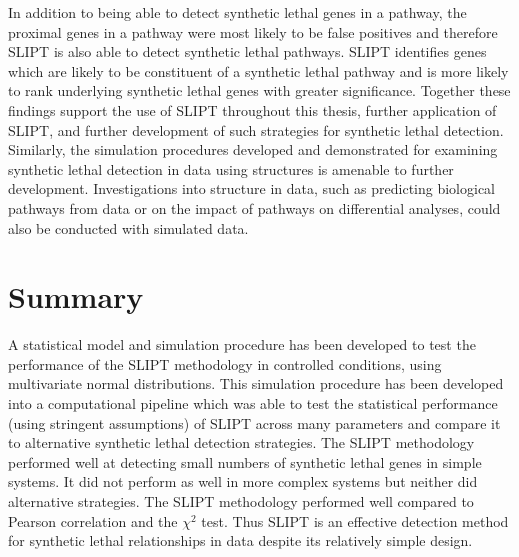 In addition to being able to detect \gls{synthetic lethal} genes in a pathway, the proximal genes in a pathway were most likely to be false positives and therefore \gls{SLIPT} is also able to detect \gls{synthetic lethal} pathways. \gls{SLIPT} identifies genes which are likely to be constituent of a \gls{synthetic lethal} pathway and is more likely to rank underlying \gls{synthetic lethal} genes with greater significance. Together these findings support the use of \gls{SLIPT} throughout this thesis, further application of \gls{SLIPT}, and further development of such strategies for \gls{synthetic lethal} detection. Similarly, the simulation procedures developed and demonstrated for examining \gls{synthetic lethal} detection in  data using  structures is amenable to further development. Investigations into  structure in  data, such as predicting biological pathways from  data or on the impact of pathways on differential  analyses, could also be conducted with simulated data.


\section{Summary}

A statistical model and simulation procedure has been developed to test the performance of the \gls{SLIPT} methodology in controlled conditions, using multivariate normal distributions. This simulation procedure has been developed into a computational pipeline which was able to test the statistical performance (using stringent assumptions) of \gls{SLIPT} across many parameters and compare it to alternative \gls{synthetic lethal} detection strategies. The \gls{SLIPT} methodology performed well at detecting small numbers of \gls{synthetic lethal} genes in simple systems. It did not perform as well in more complex systems but neither did alternative strategies. The \gls{SLIPT} methodology performed well compared to Pearson correlation and the $\chi^2$ test. Thus \gls{SLIPT} is an effective detection method for \gls{synthetic lethal} relationships in  data despite its relatively simple design.

